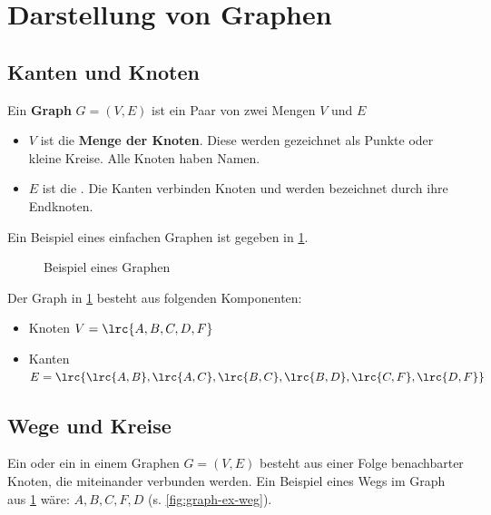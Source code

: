 \section{Darstellung von Graphen}
\subsection{Kanten und Knoten}
Ein \textbf{Graph} $G=(V,E)$ ist ein Paar von zwei Mengen $V$ und $E$
\begin{itemize}
    \item $V$ ist die \textbf{Menge der Knoten}. Diese werden gezeichnet als Punkte oder kleine Kreise. Alle Knoten haben Namen.
    \item $E$ ist die . Die Kanten verbinden Knoten und werden bezeichnet durch ihre Endknoten.
\end{itemize}

Ein Beispiel eines einfachen Graphen ist gegeben in \cref{fig:graph-ex}.
\begin{figure}[H]
    \centering
    \caption{Beispiel eines Graphen}
    \label{fig:graph-ex}
\end{figure}
Der Graph in \cref{fig:graph-ex} besteht aus folgenden Komponenten:
\begin{itemize}
    \item Knoten $V=\lrc{A,B,C,D,F}$
    \item Kanten $E=\lrc{\lrc{A,B},\lrc{A,C},\lrc{B,C},\lrc{B,D},\lrc{C,F},\lrc{D,F}}$
\end{itemize}
\subsection{Wege und Kreise}
Ein  oder ein  in einem Graphen $G=(V,E)$ besteht aus einer Folge benachbarter Knoten, die miteinander verbunden werden. Ein Beispiel eines Wegs im Graph aus \cref{fig:graph-ex} wäre: $A,B,C,F,D$ (s. \cref{fig:graph-ex-weg}). 

